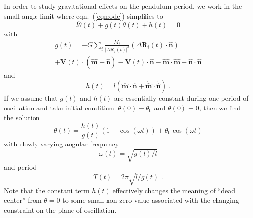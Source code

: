 \documentclass[12pt]{article}
\providecommand{\eqn}[1]{eqn.~(\ref{eqn:#1})}
\providecommand{\vecsymbol}[1]{\ensuremath{\boldsymbol{#1}}}
\providecommand{\Rv}{\vecsymbol{R}}
\providecommand{\Vv}{\vecsymbol{V}}
\providecommand{\mv}{\hat{\vecsymbol{m}}}
\providecommand{\nv}{\hat{\vecsymbol{n}}}
\providecommand{\thdot}{\dot{\theta}}
\providecommand{\thddot}{\ddot{\theta}}
\begin{document}
In order to study gravitational effects on the pendulum period, we work in the small angle limit where \eqn{ode} simplifies to
\begin{equation}
l \thddot(t) + g(t) \theta(t) + h(t) = 0
\end{equation}
with
\begin{multline}
g(t) = -G \sum_i \frac{M_i}{\left|\Delta\Rv_i(t)\right|^3} \left(\Delta\Rv_i(t)\cdot\nv\right) \\
+ \Vv(t)\cdot\left(\dot{\mv}-\dot{\nv}\right) - \dot{\Vv(t)}\cdot\nv
- \dot{\mv}\cdot\dot{\mv} + \dot{\nv}\cdot\dot{\nv}
\end{multline}
and
\begin{equation}
h(t) = l(\mv\cdot\ddot{\nv} + \dot{\mv}\cdot\dot{\nv}) \; .
\end{equation}
If we assume that $g(t)$ and $h(t)$ are essentially constant during one period of oscillation and take initial conditions $\theta(0) = \theta_0$ and $\thdot(0) = 0$, then we find the solution
\begin{equation}
\theta(t) = \frac{h(t)}{g(t)}\left( 1 - \cos(\omega t) \right) + \theta_0 \cos(\omega t)
\end{equation}
with slowly varying angular frequency
\begin{equation}
\omega(t) = \sqrt{g(t)/l}
\end{equation}
and period
\begin{equation}
T(t) = 2\pi \sqrt{l/g(t)} \; .
\end{equation}
Note that the constant term $h(t)$ effectively changes the meaning of ``dead center'' from $\theta = 0$ to some small non-zero value associated with the changing constraint on the plane of oscillation.
\end{document}
